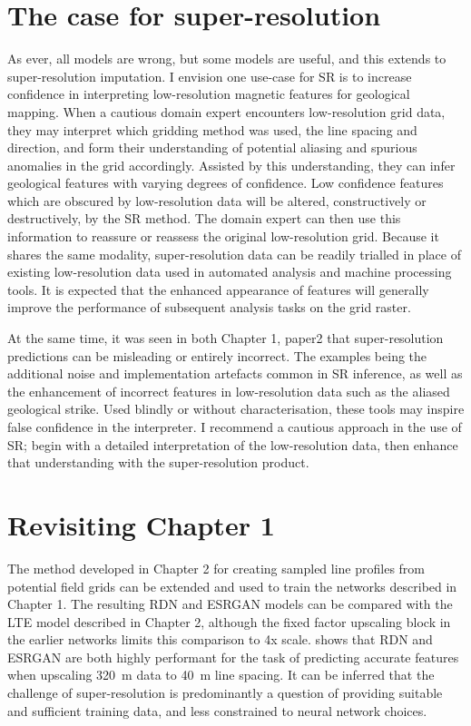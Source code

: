 \documentclass[manuscript.tex]{subfiles}
\begin{document}
\section{The case for super-resolution}
As ever, all models are wrong, but some models are useful, and this extends to super-resolution imputation.
I envision one use-case for SR is to increase confidence in interpreting low-resolution magnetic features for geological mapping. 
When a cautious domain expert encounters low-resolution grid data, they may interpret which gridding method was used, the line spacing and direction, and form their understanding of potential aliasing and spurious anomalies in the grid accordingly.
Assisted by this understanding, they can infer geological features with varying degrees of confidence.
Low confidence features which are obscured by low-resolution data will be altered, constructively or destructively, by the SR method.
The domain expert can then use this information to reassure or reassess the original low-resolution grid.
Because it shares the same modality, super-resolution data can be readily trialled in place of existing low-resolution data used in automated analysis and machine processing tools.
It is expected that the enhanced appearance of features will generally improve the performance of subsequent analysis tasks on the grid raster.

At the same time, it was seen in both Chapter 1, paper2 that super-resolution predictions can be misleading or entirely incorrect.
The examples being the additional noise and implementation artefacts common in SR inference, as well as the enhancement of incorrect features in low-resolution data such as the aliased geological strike.
Used blindly or without characterisation, these tools may inspire false confidence in the interpreter.
I recommend a cautious approach in the use of SR\@; begin with a detailed interpretation of the low-resolution data, then enhance that understanding with the super-resolution product.

\section{Revisiting Chapter 1}
The method developed in Chapter 2 for creating sampled line profiles from potential field grids can be extended and used to train the networks described in Chapter 1.
The resulting RDN and ESRGAN models can be compared with the LTE model described in Chapter 2, although the fixed factor upscaling block in the earlier networks limits this comparison to 4x scale.
 shows that RDN and ESRGAN are both highly performant for the task of predicting accurate features when upscaling \SI{320}{\m} data to \SI{40}{\m} line spacing.
It can be inferred that the challenge of super-resolution is predominantly a question of providing suitable and sufficient training data, and less constrained to neural network choices.
\end{document}
